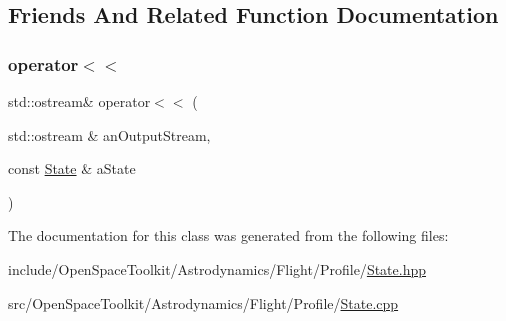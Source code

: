 \subsection{Friends And Related Function Documentation}
\mbox{\label{classostk_1_1astro_1_1flight_1_1profile_1_1_state_abba03f039f2534d691a1dc28426e8b89}} 
\subsubsection{\texorpdfstring{operator$<$$<$}{operator<<}}
{\footnotesize\ttfamily std\+::ostream\& operator$<$$<$ (\begin{DoxyParamCaption}\item[{std\+::ostream \&}]{an\+Output\+Stream,  }\item[{const \hyperlink{classostk_1_1astro_1_1flight_1_1profile_1_1_state}{State} \&}]{a\+State }\end{DoxyParamCaption})\hspace{0.3cm}{\ttfamily [friend]}}



The documentation for this class was generated from the following files\+:\begin{DoxyCompactItemize}
\item 
include/\+Open\+Space\+Toolkit/\+Astrodynamics/\+Flight/\+Profile/\hyperlink{_flight_2_profile_2_state_8hpp}{State.\+hpp}\item 
src/\+Open\+Space\+Toolkit/\+Astrodynamics/\+Flight/\+Profile/\hyperlink{_flight_2_profile_2_state_8cpp}{State.\+cpp}\end{DoxyCompactItemize}
